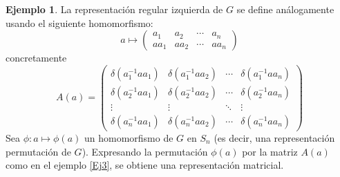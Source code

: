 \documentclass[12pt]{book}
\theoremstyle{definition}
\newtheorem{example}[theorem]{Ejemplo}
\newcounter{in}
\begin{document}
\begin{example}
  La representación regular izquierda de $G$ se define análogamente
  usando el siguiente homomorfismo:
  \begin{equation*}
    a \mapsto
    \begin{pmatrix}
      a_{1} & a_{2} & \cdots  & a_{n}\\ 
      aa_{1} & aa_{2} & \cdots & aa_{n}
    \end{pmatrix}
  \end{equation*}
  concretamente
  \begin{equation}
    \label{eq:8}
    A\left(a\right) = 
    \begin{pmatrix}
      \delta\left(a_{1}^{-1}aa_{1}\right) & \delta\left(a_{1}^{-1}aa_{2}\right) & \cdots  & \delta\left(a_{1}^{-1}aa_{n}\right)\\
      \delta\left(a_{2}^{-1}aa_{1}\right) & \delta\left(a_{2}^{-1}aa_{2}\right) & \cdots  & \delta\left(a_{2}^{-1}aa_{n}\right)\\ 
      \vdots & \vdots & \ddots & \vdots\\
      \delta\left(a_{n}^{-1}aa_{1}\right) & \delta\left(a_{n}^{-1}aa_{2}\right) & \cdots  & \delta\left(a_{n}^{-1}aa_{n}\right)
    \end{pmatrix} 
  \end{equation}
  Sea $\phi \colon a \mapsto \phi\left(a\right)$ un homomorfismo de $G$
  en $S_{n}$ (es decir, una representación permutación de
  $G$). Expresando la permutación $\phi\left(a\right)$ por la matriz
  $A\left(a\right)$ como en el ejemplo \ref{Ej3}, se obtiene una
  representación matricial.
\end{example}
\end{document}
